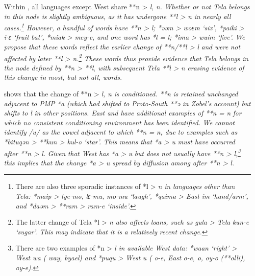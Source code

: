 Within ,
all languages except West  share **n > \it{l, n}.
Whether or not Tela belongs in this node is slightly ambiguous,
as it has undergone **l > \it{n} in nearly all cases.\footnote{
		There are also three sporadic instances of *l > \it{n} in  languages other than Tela: *maip >  \it{lye-mo},
		 \it{lɛ-mu},  \it{mo-mu} ‘laugh’,
		*qaima > East  \it{im} ‘hand/arm’,
		and *daəm > **ram >  \it{ram-e}
		‘inside’.}
However, a handful of words have **n > \it{l}; *əəm > \it{woɛm}
‘six’, *paiki > \it{i-ɛ} ‘fruit bat’,
*miak > \it{mey-e}, and one word has *l = \it{l};
*ima > \it{wuim} ‘five’.
We propose that these words reflect the earlier change of **n/**l
> \it{l} and were not affected by later **l > \it{n}.\footnote{
		The latter
		change of Tela *l > \it{n} also affects loans,
		such as  \it{gula} > Tela \it{kun-e} ‘sugar’.
		This may indicate that it is a relatively recent change.}
These words thus provide evidence that Tela belongs in the node defined
by **n > **l, with subsequent Tela **l > \it{n} erasing evidence of this change
in most, but not all, words.

\citet{Zobel2018} shows that the change of **n > \it{l, n}
is conditioned.
**n is retained unchanged adjacent to PMP *a (which had shifted
to Proto-South  **ə in Zobel’s account) but shifts to \it{l} in other positions.
East  and  have additional examples of **n = \it{n}
for which no consistent conditioning environment has been identified.
We cannot identify /u/ as the vowel adjacent to which **n = \it{n},
due to examples such as *bituqən > **kun >  \it{kul-o} ‘star’.
This means that *a > \it{u} must have occurred after **n > \it{l}.
Given that West  has *a > \it{u} but does not usually
have **n > \it{l},\footnote{
		There are two examples of *n > \it{l}
		in available West  data: *waan ‘right’ > West 
		\it{wa} (  \it{way},
		 \it{byael}) and *puqu > West  \it{u}
		(  \it{o-e}, East  \it{o-e},  \it{o},
		 \it{oy-o} (**olli),  \it{oy-e}).}
this implies that the change *a > \it{u} spread by diffusion
among  after **n > \it{l}.

